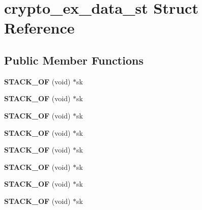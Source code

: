 \hypertarget{structcrypto__ex__data__st}{}\section{crypto\+\_\+ex\+\_\+data\+\_\+st Struct Reference}
\label{structcrypto__ex__data__st}
\subsection*{Public Member Functions}
\begin{DoxyCompactItemize}
\item 
\mbox{\label{structcrypto__ex__data__st_a93c15b810c664dd4371409fbcca0e68a}} 
{\bfseries S\+T\+A\+C\+K\+\_\+\+OF} (void) $\ast$sk
\item 
\mbox{\label{structcrypto__ex__data__st_a93c15b810c664dd4371409fbcca0e68a}} 
{\bfseries S\+T\+A\+C\+K\+\_\+\+OF} (void) $\ast$sk
\item 
\mbox{\label{structcrypto__ex__data__st_a93c15b810c664dd4371409fbcca0e68a}} 
{\bfseries S\+T\+A\+C\+K\+\_\+\+OF} (void) $\ast$sk
\item 
\mbox{\label{structcrypto__ex__data__st_a93c15b810c664dd4371409fbcca0e68a}} 
{\bfseries S\+T\+A\+C\+K\+\_\+\+OF} (void) $\ast$sk
\item 
\mbox{\label{structcrypto__ex__data__st_a93c15b810c664dd4371409fbcca0e68a}} 
{\bfseries S\+T\+A\+C\+K\+\_\+\+OF} (void) $\ast$sk
\item 
\mbox{\label{structcrypto__ex__data__st_a93c15b810c664dd4371409fbcca0e68a}} 
{\bfseries S\+T\+A\+C\+K\+\_\+\+OF} (void) $\ast$sk
\item 
\mbox{\label{structcrypto__ex__data__st_a93c15b810c664dd4371409fbcca0e68a}} 
{\bfseries S\+T\+A\+C\+K\+\_\+\+OF} (void) $\ast$sk
\item 
\mbox{\label{structcrypto__ex__data__st_a93c15b810c664dd4371409fbcca0e68a}} 
{\bfseries S\+T\+A\+C\+K\+\_\+\+OF} (void) $\ast$sk
\end{DoxyCompactItemize}
